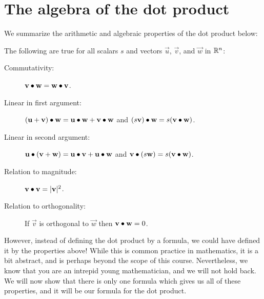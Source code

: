 \documentclass{ximera}
\begin{document}
\section{The algebra of the dot product}

We summarize the arithmetic and algebraic properties of the dot
product below:
\begin{theorem}
  The following are true for all scalars $s$ and vectors
  $\vec{u}$, $\vec{v}$, and $\vec{w}$ in $\mathbb R^n$:
  \begin{description}
  \item[Commutativity:] $\mathbf{v} \bullet \mathbf{w} = \mathbf{w} \bullet
    \mathbf{v}$.
  \item[Linear in first argument:] $(\mathbf{u}+\mathbf{v})\bullet \mathbf{w} = \mathbf{u}\bullet \mathbf{w} +
    \mathbf{v}\bullet \mathbf{w}$ and $(s\mathbf{v})\bullet \mathbf{w} = s(\mathbf{v}
    \bullet \mathbf{w})$.
  \item[Linear in second argument:] $\mathbf{u} \bullet (\mathbf{v}+\mathbf{w}) = \mathbf{u}\bullet \mathbf{v}+
    \mathbf{u}\bullet \mathbf{w}$ and $\mathbf{v} \bullet (s\mathbf{w}) = s(\mathbf{v}
    \bullet \mathbf{w})$.
  \item[Relation to magnitude:] $\mathbf{v} \bullet \mathbf{v} = |\mathbf{v}|^2$.
  \item[Relation to orthogonality:] If $\vec{v}$ is orthogonal to
    $\vec{w}$ then $\mathbf{v} \bullet \mathbf{w} = 0$.
  \end{description}
\end{theorem}

However, instead of defining the dot product by a formula, we could
have defined it by the properties above!  While this is common
practice in mathematics, it is a bit abstract, and is perhaps beyond
the scope of this course. Nevertheless, we know that you are an
intrepid young mathematician, and we will not hold back.  We will now
show that there is only one formula which gives us all of these
properties, and it will be our formula for the dot product.
\end{document}
